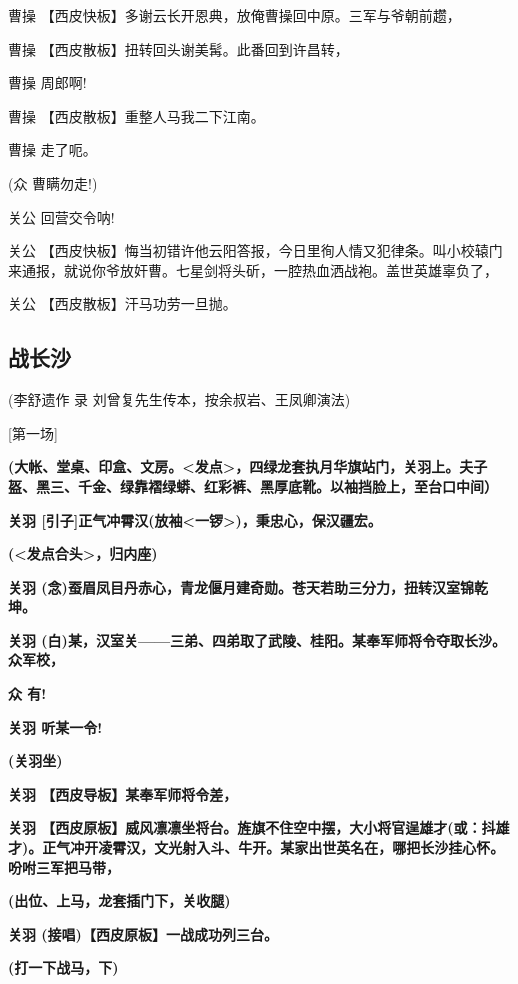曹操 【西皮快板】多谢云长开恩典，放俺曹操回中原。三军与爷朝前趱，

曹操 【西皮散板】扭转回头谢美髯。此番回到许昌转，

曹操 周郎啊!

曹操 【西皮散板】重整人马我二下江南。

曹操 走了呃。

(众 曹瞒勿走!)

关公 回营交令呐!

关公
【西皮快板】悔当初错许他云阳答报，今日里徇人情又犯律条。叫小校辕门来通报，就说你爷放奸曹。七星剑将头斫，一腔热血洒战袍。盖世英雄辜负了，

关公 【西皮散板】汗马功劳一旦抛。

\newpage
\hypertarget{ux6218ux957fux6c99}{%
\subsection{战长沙}\label{ux6218ux957fux6c99}}

(李舒遗作 录 刘曾复先生传本，按余叔岩、王凤卿演法)

{[}第一场{]}

\textbf{(大帐、堂桌、印盒、文房。\textless{}发点\textgreater{}，四绿龙套执月华旗站门，关羽上。夫子盔、黑三、千金、绿靠褶绿蟒、红彩裤、黑厚底靴。以袖挡脸上，至台口中间）}

\textbf{关羽
{[}引子{]}正气冲霄汉(放袖\textless{}一锣\textgreater{})，秉忠心，保汉疆宏。}

\textbf{(\textless{}发点合头\textgreater{}，归内座)}

\textbf{关羽
(念)蚕眉凤目丹赤心，青龙偃月建奇勋。苍天若助三分力，扭转汉室锦乾坤。}

\textbf{关羽
(白)某，汉室关------三弟、四弟取了武陵、桂阳。某奉军师将令夺取长沙。众军校，}

\textbf{众 有!}

\textbf{关羽 听某一令!}

\textbf{(关羽坐)}

\textbf{关羽 【西皮导板】某奉军师将令差，}

\textbf{关羽
【西皮原板】威风凛凛坐将台。旌旗不住空中摆，大小将官逞雄才(或：抖雄才)。正气冲开凌霄汉，文光射入斗、牛开。某家出世英名在，哪把长沙挂心怀。吩咐三军把马带，}

\textbf{(出位、上马，龙套插门下，关收腿)}

\textbf{关羽 (接唱)【西皮原板】一战成功列三台。}

\textbf{(打一下战马，下)}

